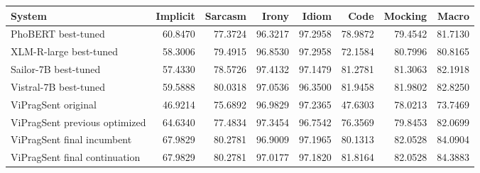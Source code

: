 \begin{tabular}{lrrrrrrr}
System & Implicit & Sarcasm & Irony & Idiom & Code & Mocking & Macro \\
\hline
PhoBERT best-tuned & 60.8470 & 77.3724 & 96.3217 & 97.2958 & 78.9872 & 79.4542 & 81.7130 \\
XLM-R-large best-tuned & 58.3006 & 79.4915 & 96.8530 & 97.2958 & 72.1584 & 80.7996 & 80.8165 \\
Sailor-7B best-tuned & 57.4330 & 78.5726 & 97.4132 & 97.1479 & 81.2781 & 81.3063 & 82.1918 \\
Vistral-7B best-tuned & 59.5888 & 80.0318 & 97.0536 & 96.3500 & 81.9458 & 81.9802 & 82.8250 \\
ViPragSent original & 46.9214 & 75.6892 & 96.9829 & 97.2365 & 47.6303 & 78.0213 & 73.7469 \\
ViPragSent previous optimized & 64.6340 & 77.4834 & 97.3454 & 96.7542 & 76.3569 & 79.8453 & 82.0699 \\
ViPragSent final incumbent & 67.9829 & 80.2781 & 96.9009 & 97.1965 & 80.1313 & 82.0528 & 84.0904 \\
ViPragSent final continuation & 67.9829 & 80.2781 & 97.0177 & 97.1820 & 81.8164 & 82.0528 & 84.3883 \\
\end{tabular}

